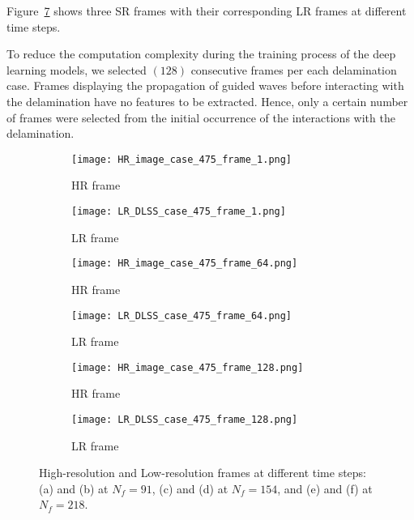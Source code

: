 Figure~\ref{fig:SR_LR} shows three SR frames with their corresponding LR frames at different time steps.

To reduce the computation complexity during the training process of the deep learning models, we selected \((128)\) consecutive frames per each delamination case.
Frames displaying the propagation of guided waves before interacting with the delamination have no features to be extracted. 
Hence, only a certain number of frames were selected from the initial occurrence of the interactions with the delamination.

\begin{figure} [!ht]
	\centering
	\begin{subfigure}[b]{.48\textwidth}
		\centering
	\texttt{[image: HR\_image\_case\_475\_frame\_1.png]}
		\caption{HR frame}
		\label{fig:SR_1}
	\end{subfigure}
	\hfill
	\begin{subfigure}[b]{.48\textwidth}
		\centering
		\texttt{[image: LR\_DLSS\_case\_475\_frame\_1.png]}
		\caption{LR frame}
		\label{fig:LR_1}	
	\end{subfigure}
	\hfill
		\begin{subfigure}[b]{.48\textwidth}
		\centering
		\texttt{[image: HR\_image\_case\_475\_frame\_64.png]}
		\caption{HR frame}
		\label{fig:SR_2}
	\end{subfigure}
	\hfill
	\begin{subfigure}[b]{.48\textwidth}
		\centering
		\texttt{[image: LR\_DLSS\_case\_475\_frame\_64.png]}
		\caption{LR frame}
		\label{fig:LR_2}	
	\end{subfigure}
	\hfill
		\begin{subfigure}[b]{.48\textwidth}
		\centering
		\texttt{[image: HR\_image\_case\_475\_frame\_128.png]}
		\caption{HR frame}
		\label{fig:SR_3}
	\end{subfigure}
	\hfill
	\begin{subfigure}[b]{.48\textwidth}
		\centering
		\texttt{[image: LR\_DLSS\_case\_475\_frame\_128.png]}
		\caption{LR frame}
		\label{fig:LR_3}	
	\end{subfigure}
	\caption{High-resolution and Low-resolution frames at different time steps: (a) and (b) at $N_f=91$, (c) and (d) at $N_f=154$, and (e) and (f) at $N_f=218$.}
	\label{fig:SR_LR}
\end{figure}
\newpage